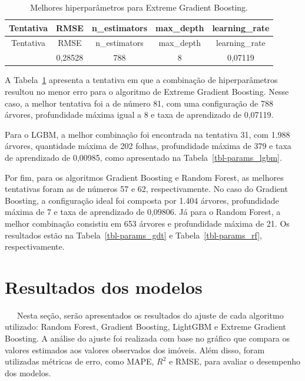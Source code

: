 \documentclass[
  12pt,
  a4paper,
]{scrreprt}
\begin{document}
\begin{longtable}[]{@{}ccccc@{}}
\caption{Melhores hiperparâmetros para Extreme Gradient
Boosting.}\label{tbl-params_xgb}\tabularnewline
\toprule\noalign{}
Tentativa & RMSE & n\_estimators & max\_depth & learning\_rate \\
\midrule\noalign{}
\endfirsthead
\toprule\noalign{}
Tentativa & RMSE & n\_estimators & max\_depth & learning\_rate \\
\midrule\noalign{}
\endhead
\bottomrule\noalign{}
\endlastfoot
81 & 0,28528 & 788 & 8 & 0,07119 \\
\end{longtable}

A Tabela~\ref{tbl-params_xgb} apresenta a tentativa em que a combinação
de hiperparâmetros resultou no menor erro para o algoritmo de Extreme
Gradient Boosting. Nesse caso, a melhor tentativa foi a de número 81,
com uma configuração de 788 árvores, profundidade máxima igual a 8 e
taxa de aprendizado de 0,07119.

\vspace{12pt}

Para o LGBM, a melhor combinação foi encontrada na tentativa 31, com
1.988 árvores, quantidade máxima de 202 folhas, profundidade máxima de
379 e taxa de aprendizado de 0,00985, como apresentado na
Tabela~\ref{tbl-params_lgbm}.

\vspace{12pt}

Por fim, para os algoritmos Gradient Boosting e Random Forest, as
melhores tentativas foram as de números 57 e 62, respectivamente. No
caso do Gradient Boosting, a configuração ideal foi composta por 1.404
árvores, profundidade máxima de 7 e taxa de aprendizado de 0,09806. Já
para o Random Forest, a melhor combinação consistiu em 653 árvores e
profundidade máxima de 21. Os resultados estão na
Tabela~\ref{tbl-params_gdt} e Tabela~\ref{tbl-params_rf},
respectivamente.

\section{Resultados dos modelos}\label{resultados-dos-modelos}

~~~Nesta seção, serão apresentados os resultados do ajuste de cada
algoritmo utilizado: Random Forest, Gradient Boosting, LightGBM e
Extreme Gradient Boosting. A análise do ajuste foi realizada com base no
gráfico que compara os valores estimados aos valores observados dos
imóveis. Além disso, foram utilizadas métricas de erro, como MAPE,
\(R^2\) e RMSE, para avaliar o desempenho dos modelos.
\end{document}
